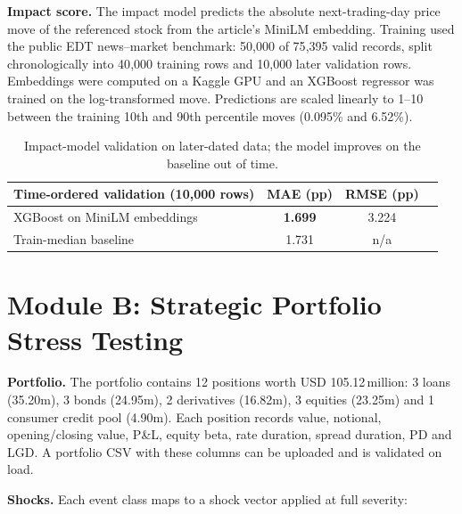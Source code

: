 \documentclass[11pt,a4paper]{article}
\begin{document}
\textbf{Impact score.} The impact model predicts the absolute next-trading-day price move of the referenced stock from the article's MiniLM embedding. Training used the public EDT news--market benchmark: 50{,}000 of 75{,}395 valid records, split chronologically into 40{,}000 training rows and 10{,}000 later validation rows. Embeddings were computed on a Kaggle GPU and an XGBoost regressor was trained on the log-transformed move. Predictions are scaled linearly to 1--10 between the training 10th and 90th percentile moves (0.095\% and 6.52\%).

\begin{table}[!htbp]
\centering\small
\begin{tabular}{@{}lccc@{}}
\toprule
\textbf{Time-ordered validation (10{,}000 rows)} & \textbf{MAE (pp)} & \textbf{RMSE (pp)}\\
\midrule
XGBoost on MiniLM embeddings & \textbf{1.699} & 3.224\\
Train-median baseline & 1.731 &n/a\\
\bottomrule
\end{tabular}
\caption{Impact-model validation on later-dated data; the model improves on the baseline out of time.}
\end{table}

\section{Module B: Strategic Portfolio Stress Testing}
\textbf{Portfolio.} The portfolio contains 12 positions worth USD 105.12\,million: 3 loans (35.20m), 3 bonds (24.95m), 2 derivatives (16.82m), 3 equities (23.25m) and 1 consumer credit pool (4.90m). Each position records value, notional, opening/closing value, P\&L, equity beta, rate duration, spread duration, PD and LGD. A portfolio CSV with these columns can be uploaded and is validated on load.

\textbf{Shocks.} Each event class maps to a shock vector applied at full severity:
\end{document}
